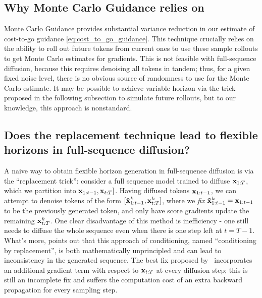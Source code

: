 \subsection{Why Monte Carlo Guidance relies on \algo}
\label{app:cannot_mcg}
Monte Carlo Guidance provides substantial variance reduction in our estimate of cost-to-go guidance \eqref{eq:cost_to_go_guidance}. This technique crucially relies on the ability to roll out future tokens from current ones to use these sample rollouts to get Monte Carlo estimates for gradients. This is not feasible with full-sequence diffusion, because this requires denoising all tokens in tandem; thus, for a given fixed noise level, there is no obvious source of randomness to use for the Monte Carlo estimate. It may be possible to achieve variable horizon via the trick proposed in the following subsection to simulate future rollouts, but to our knowledge, this approach is nonstandard.  



\subsection{Does the replacement technique lead to flexible horizons in full-sequence diffusion?}
\label{app:cond_replacement}
A naive way to obtain flexible horizon generation in full-sequence diffusion is via the ``replacement trick'': consider a full sequence model trained to diffuse $\mathbf{x}_{1:T}$, which we partition into $\mathbf{x}_{1:t-1},\mathbf{x}_{t:T}]$. Having diffused tokens $\mathbf{x}_{1:t-1}$, we can attempt to denoise tokens of the form $[\tilde {\mathbf{x}}_{1:t-1}^{k},\mathbf{x}_{t:T}^k]$, where we \emph{fix} $\tilde {\mathbf{x}}_{1:t-1}^{k} = \mathbf{x}_{1:t-1}$ to be the previously generated token, and only have score gradients update the remaining $\mathbf{x}_{t:T}^k$.  One clear disadvantage of this method is inefficiency - one still needs to diffuse the whole sequence even when there is one step left at $t=T-1$. What's more, \cite{ho2022video} points out that this approach of conditioning, named ``conditioning by replacement'', is both mathematically unprincipled and can lead to inconsistency in the generated sequence. The best fix proposed by~\cite{ho2022video} incorporates an additional gradient term with respect to $\mathbf{x}_{t:T}$ at every diffusion step; this is still an incomplete fix and suffers the computation cost of an extra backward propagation for every sampling step.

